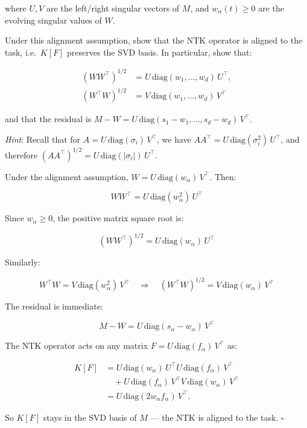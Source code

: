 \documentclass[11pt]{article}
\begin{document}
where \(U, V\) are the left/right singular vectors of \(M\), and
\(w_\alpha(t) \geq 0\) are the evolving singular values of \(W\).

\begin{exercise}
\label{ex:td-3ai}
Under this alignment assumption, show that the NTK
operator is aligned to the task, i.e.~\(K[F]\) preserves the SVD basis.
In particular, show that:

\begin{align*}
(WW^\top)^{1/2} &= U\,\text{diag}(w_1, \ldots, w_d)\,U^\top, \\
(W^\top W)^{1/2} &= V\,\text{diag}(w_1, \ldots, w_d)\,V^\top
\end{align*}

and that the residual is
\(M - W = U\,\text{diag}(s_1 - w_1, \ldots, s_d - w_d)\,V^\top\).

\emph{Hint}: Recall that for \(A = U\,\text{diag}(\sigma_i)\,V^\top\),
we have \(AA^\top = U\,\text{diag}(\sigma_i^2)\,U^\top\), and therefore
\((AA^\top)^{1/2} = U\,\text{diag}(|\sigma_i|)\,U^\top\).
\end{exercise}

\begin{solution}[ex:td-3ai]
Under the alignment assumption,
\(W = U\,\text{diag}(w_\alpha)\,V^\top\). Then:

\[WW^\top = U\,\text{diag}(w_\alpha^2)\,U^\top\]

Since \(w_\alpha \geq 0\), the positive matrix square root is:

\[(WW^\top)^{1/2} = U\,\text{diag}(w_\alpha)\,U^\top\]

Similarly:

\[W^\top W = V\,\text{diag}(w_\alpha^2)\,V^\top \quad \Longrightarrow \quad (W^\top W)^{1/2} = V\,\text{diag}(w_\alpha)\,V^\top\]

The residual is immediate:

\[M - W = U\,\text{diag}(s_\alpha - w_\alpha)\,V^\top\]

The NTK operator acts on any matrix
\(F = U\,\text{diag}(f_\alpha)\,V^\top\) as:

\[
\begin{aligned}
K[F]
&=
U\,\text{diag}(w_\alpha)\,U^\top
U\,\text{diag}(f_\alpha)\,V^\top \\
&\quad
+ U\,\text{diag}(f_\alpha)\,V^\top
V\,\text{diag}(w_\alpha)\,V^\top \\
&=
U\,\text{diag}(2w_\alpha f_\alpha)\,V^\top.
\end{aligned}
\]

So \(K[F]\) stays in the SVD basis of \(M\) --- the NTK is aligned to
the task. \(\square\)
\end{solution}
\end{document}
